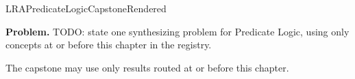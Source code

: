 \ifcsname LRAPredicateLogicCapstoneRendered\endcsname
\else
\expandafter\gdef\csname LRAPredicateLogicCapstoneRendered\endcsname{}

\newpage
{}
\label{cap:predicate-logic}

\begin{tcolorbox}[
  colback=gray!6,
  colframe=gray!40,
  arc=2pt,
  left=8pt, right=8pt, top=6pt, bottom=6pt,
  title={\small\textbf{Capstone Problem}},
  fonttitle=\small\bfseries
]
\textbf{Problem.}
TODO: state one synthesizing problem for Predicate Logic, using only concepts at or
before this chapter in the registry.
\end{tcolorbox}

\begin{remark*}
The capstone may use only results routed at or before this chapter.
\end{remark*}

\clearpage
\fi
